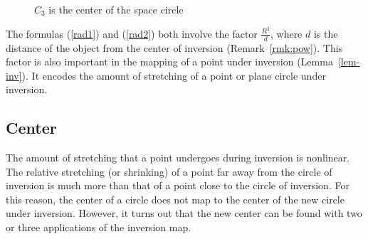 
\begin{figure}
\vspace{2.25in}
\caption{$C_3$ is the center of the space circle}
\label{fig:space-center}
\end{figure}

\begin{rmk}
The formulas (\ref{rad1}) and (\ref{rad2}) both 
involve the factor $\frac{R^2}{d}$, 
where $d$ is the
distance of the object from the center of inversion (Remark~\ref{rmk:pow}).
This factor is also important in the mapping of a point under inversion
(Lemma~\ref{lem-inv}).
It encodes the amount of stretching of a point or plane circle 
under inversion.
%
\end{rmk}


\subsection{Center}

The amount of stretching that a point undergoes during inversion is nonlinear.
The relative stretching (or shrinking) 
of a point far away from the circle of inversion 
is much more than that of a point close to the circle of inversion.
For this reason, the center of a circle does not map to the center of the new
circle under inversion.
However, it turns out that the new center 
can be found with two or three applications of the inversion map.

